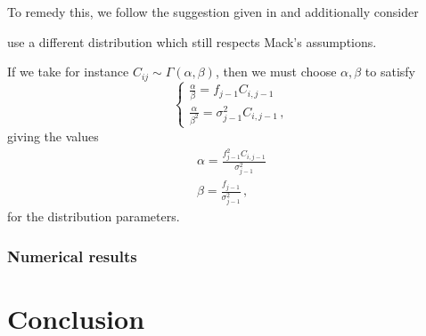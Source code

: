 \documentclass[a4paper]{book}
\theoremstyle{plain}
\begin{document}
To remedy this, we follow the suggestion given in \cite[238]{england:dist} and additionally consider 

use a different distribution which still respects Mack's assumptions. 

If we take for instance $C_{ij} \sim \Gamma(\alpha, \beta)$, then we must choose $\alpha, \beta$ to satisfy
\begin{displaymath}
\begin{cases}
\frac{\alpha}{\beta} = f_{j-1} C_{i, j-1} \\
\frac{\alpha}{\beta^2} = \sigma^2_{j-1} C_{i, j-1} \,,
\end{cases}
\end{displaymath}
giving the values
\begin{gather*}
\alpha = \frac{f_{j-1}^2 C_{i, j-1}}{\sigma_{j-1}^2} \\
\beta = \frac{f_{j-1}}{\sigma_{j-1}^2} \,,
\end{gather*}
for the distribution parameters.

\subsection{Numerical results} \label{sec:num}


\backmatter%
\chapter{Conclusion}

\printbibliography%
\end{document}
